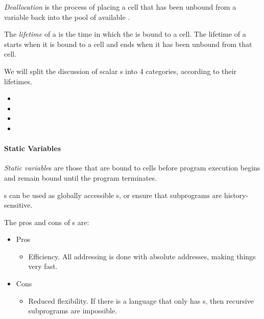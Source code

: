 \begin{definition}[Deallocation]\label{def:Variable_Memory_Deallocation}
  \emph{Deallocation} is the process of placing a  cell that has been unbound from a variable back into the pool of available .
\end{definition}

\begin{definition}[Lifetime]\label{def:Variable_Lifetime}
  The \emph{lifetime} of a  is the time in which the  is bound to a  cell.
  The lifetime of a  starts when it is bound to a cell and ends when it has been unbound from that cell.

  We will split the discussion of scalar s into 4 categories, according to their lifetimes.
  \begin{itemize}[noitemsep]
  \item {}
  \item {}
  \item {}
  \item {}
  \end{itemize}
\end{definition}

\paragraph{Static Variables}\label{par:Static_Variable_Binding_Lifetime}
\begin{definition}\label{def:Static_Variable_Binding_Lifetime}
  \emph{Static variable}s are those that are bound to  cells before program execution begins and remain bound until the program terminates.
\end{definition}

s can be used as globally accessible s, or ensure that subprograms are history-sensitive.

The pros and cons of s are:
\begin{itemize}[noitemsep]
\item Pros
  \begin{itemize}[noitemsep]
  \item Efficiency. All  addressing is done with absolute addresses, making things very fast.
  \end{itemize}
\item Cons
  \begin{itemize}[noitemsep]
  \item Reduced flexibility. If there is a language that only has s, then recursive subprograms are impossible.
  \end{itemize}
\end{itemize}

